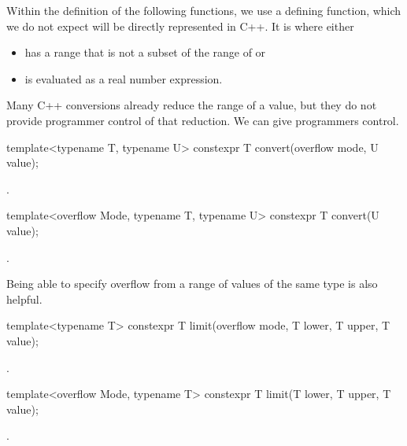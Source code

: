 \begin{addedblock}
Within the definition of the following functions, we use a defining function, which we do not expect will be directly represented in C++. It is  where  either
\begin{itemize}
\item has a range that is not a subset of the range of  or
\item is evaluated as a real number expression.
\end{itemize}

Many C++ conversions already reduce the range of a value, but they do not provide programmer control of that reduction. We can give programmers control.

\begin{itemdecl}
template<typename T, typename U>
constexpr T convert(overflow mode, U value);
\end{itemdecl}

\begin{itemdescr}
\returns {}.
\end{itemdescr}

\begin{itemdecl}
template<overflow Mode, typename T, typename U>
constexpr T convert(U value);
\end{itemdecl}

\begin{itemdescr}
\returns {}.
\end{itemdescr}

Being able to specify overflow from a range of values of the same type is also helpful.

\begin{itemdecl}
template<typename T>
constexpr T limit(overflow mode, T lower, T upper, T value);
\end{itemdecl}

\begin{itemdescr}
\returns {}.
\end{itemdescr}

\begin{itemdecl}
template<overflow Mode, typename T>
constexpr T limit(T lower, T upper, T value);
\end{itemdecl}

\begin{itemdescr}
\returns {}.
\end{itemdescr}


\end{addedblock}
